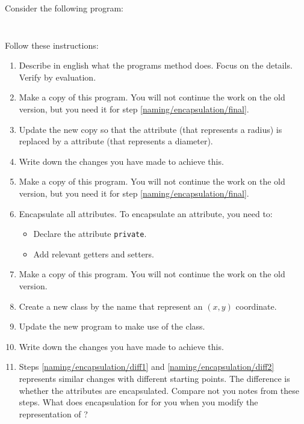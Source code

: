 Consider the following program:

\inputminted{csharp}{\context/question/Circle.cs}
\inputminted{csharp}{\context/question/TestCircle.cs}

Follow these instructions:
\begin{enumerate}
  \item Describe in english what the programs  method does. Focus on the details.  Verify by evaluation.
  \item Make a copy of this program. You will not continue the work on the old version, but you need it for step \ref{naming/encapsulation/final}.
  \item Update the new copy so that the attribute  (that represents a radius) is replaced by a  attribute (that represents a diameter).
  \item \label{naming/encapsulation/diff1} Write down the changes you have made to achieve this.
  \item Make a copy of this program. You will not continue the work on the old version, but you need it for step \ref{naming/encapsulation/final}.
  \item Encapsulate all attributes. To encapsulate an attribute, you need to:
    \begin{itemize}
      \item Declare the attribute \texttt{private}.
      \item Add relevant getters and setters.
    \end{itemize}
  \item Make a copy of this program. You will not continue the work on the old version.
  \item Create a new class by the name  that represent an $(x,y)$ coordinate.
  \item Update the new program to make use of the  class.
  \item \label{naming/encapsulation/diff2} Write down the changes you have made to achieve this.
  \item \label{naming/encapsulation/final} Steps \ref{naming/encapsulation/diff1} and \ref{naming/encapsulation/diff2} represents similar changes with different starting points. The difference is whether the attributes are encapsulated. Compare not you notes from these steps. What does encapsulation for for you when you modify the representation of ?
\end{enumerate}

